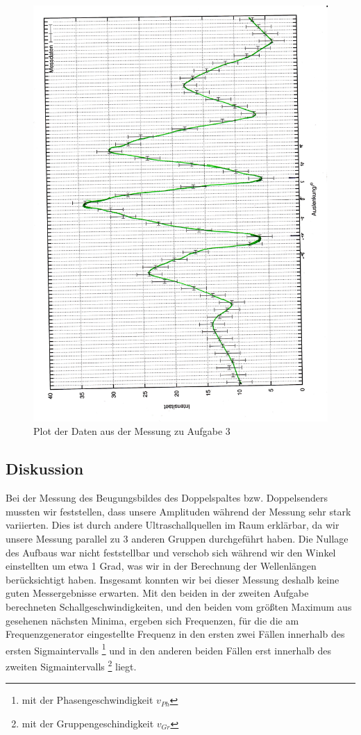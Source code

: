 \documentclass[12pt]{scrartcl}
\begin{document}
\begin{figure}[H] 
  \centering
    \includegraphics[scale = 0.5, angle = -91]{aufgabe_3_b.pdf}
  	\caption[Plot der Daten aus der Messung zu Aufgabe 3]{Plot der Daten aus der Messung zu Aufgabe 3}
  \label{fig:plot}
\end{figure}
\subsection{Diskussion}
Bei der Messung des Beugungsbildes des Doppelspaltes bzw. Doppelsenders mussten wir feststellen, dass unsere Amplituden während der Messung sehr stark variierten. Dies ist durch andere Ultraschallquellen im Raum erklärbar, da wir unsere Messung parallel zu 3 anderen Gruppen durchgeführt haben. Die Nullage des Aufbaus war nicht feststellbar und verschob sich während wir den Winkel einstellten um etwa 1 Grad, was wir in der Berechnung der Wellenlängen berücksichtigt haben. Insgesamt konnten wir bei dieser Messung deshalb keine guten Messergebnisse erwarten. Mit den beiden in der zweiten Aufgabe berechneten Schallgeschwindigkeiten, und den beiden vom größten Maximum aus gesehenen nächsten Minima, ergeben sich Frequenzen, für die die am Frequenzgenerator eingestellte Frequenz in den ersten zwei Fällen innerhalb des ersten Sigmaintervalls \footnote{mit der Phasengeschwindigkeit $v_{Ph}$} und in den anderen beiden Fällen erst innerhalb des zweiten Sigmaintervalls \footnote{mit der Gruppengeschindigkeit $v_{Gr}$} liegt.
\end{document}
